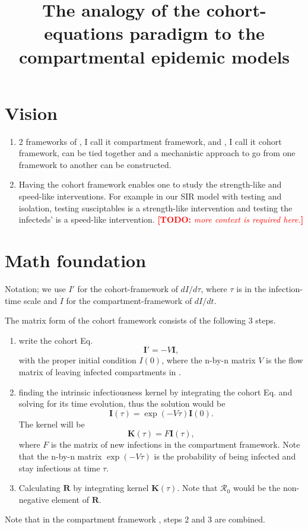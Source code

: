 \documentclass[12pt]{article}
\title{The analogy of the cohort-equations paradigm to the compartmental epidemic models}
\newcommand{\todo}[1]{\comment{red}{TODO}{#1}}
\newcommand{\R}{\ensuremath{\mathcal{R}_0}}
\renewcommand{\vec}[1]{\ensuremath{\mathbf{#1}}} %
\newcommand{\comment}{\showcomment}
\newcommand{\showcomment}[3]{\textcolor{#1}{\textbf{[#2: }\textsl{#3}\textbf{]}}}
\theoremstyle{definition} %
\begin{document}
\maketitle
\linenumbers
\section{Vision}
\begin{enumerate}
\item 2 frameworks of \cite{van2002reproduction}, I call it compartment framework, and \cite{champredon2018equivalence}, I call it cohort framework, can be tied together and a mechanistic approach to go from one framework to another can be constructed.

\item Having the cohort framework enables one to study the strength-like and speed-like interventions. For example in our SIR model with testing and isolation, testing susciptables is a strength-like intervention and testing the infecteds' is a speed-like intervention. \todo{more context is required here.}
\end{enumerate}

\section{Math foundation}
Notation; we use $I'$ for the cohort-framework of $dI/d\tau$, where $\tau$ is in the infection-time scale and $\dot I$ for the compartment-framework of $dI/dt$. 

The matrix form of the cohort framework consists of the following 3 steps.
\begin{enumerate}[{\it step 1}]
\item
write the cohort Eq. 
\begin{equation}
\label{eq:cohort}
\vec I'=-V \vec I,
\end{equation}
 with the proper initial condition $I(0)$, where the n-by-n matrix $V$ is the flow matrix of leaving infected compartments in \cite{van2002reproduction}.

\item 
finding the intrinsic infectiousness kernel by integrating the cohort Eq. and solving for its time evolution, thus
the solution would be 
\begin{equation}
\label{eq:I}
\vec I(\tau) = \exp(-V\tau) \vec I(0).
\end{equation}
The kernel will be 
\begin{equation}
\label{eq:kernel}
\vec K(\tau) = F \vec I(\tau), 
\end{equation}
where $F$ is the matrix of new infections in the compartment framework.
Note that the n-by-n matrix $\exp(-V\tau)$ is the probability of being infected and stay infectious at time $\tau$. 

\item
Calculating $\vec R$ by integrating kernel $\vec K(\tau)$. Note that $\R$ would be the non-negative element of $\vec R$.
\end{enumerate}
Note that in the compartment framework \citep{van2002reproduction}, steps 2 and 3 are combined.
\end{document}
